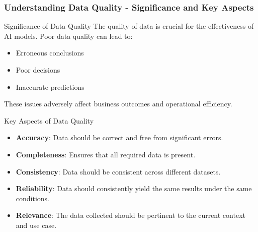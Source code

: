 \documentclass{beamer}
\begin{document}
\begin{frame}[fragile]
    \frametitle{Understanding Data Quality - Significance and Key Aspects}
    \begin{block}{Significance of Data Quality}
        The quality of data is crucial for the effectiveness of AI models. 
        Poor data quality can lead to:
        \begin{itemize}
            \item Erroneous conclusions
            \item Poor decisions
            \item Inaccurate predictions
        \end{itemize}
        These issues adversely affect business outcomes and operational efficiency.
    \end{block}
    
    \begin{block}{Key Aspects of Data Quality}
        \begin{itemize}
            \item \textbf{Accuracy}: Data should be correct and free from significant errors.
            \item \textbf{Completeness}: Ensures that all required data is present.
            \item \textbf{Consistency}: Data should be consistent across different datasets.
            \item \textbf{Reliability}: Data should consistently yield the same results under the same conditions.
            \item \textbf{Relevance}: The data collected should be pertinent to the current context and use case.
        \end{itemize}
    \end{block}
\end{frame}
\end{document}

